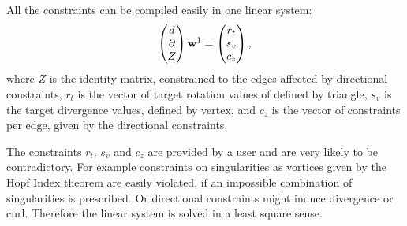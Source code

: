All the constraints can be compiled easily in one linear system:
\begin{equation}\begin{pmatrix} d \\
\partial \\
Z
\end{pmatrix} \textbf{w}^1
= \begin{pmatrix}
r_t \\
s_v \\
c_z
\end{pmatrix}, \label{eq:vfdesign1}
\end{equation}
where $Z$ is the identity matrix, constrained to the edges  affected by directional constraints, $r_t$ is the vector of target rotation values of defined by triangle, $s_v$ is the  target divergence values, defined by vertex, and $c_z$ is the vector of constraints per edge, given by the directional constraints.

The constraints $r_t$, $s_v$ and $c_z$ are provided by a user and are very likely to be contradictory. For example constraints on singularities as vortices given by the Hopf Index theorem are easily violated, if an impossible combination of singularities is prescribed. Or directional constraints might induce divergence or curl. Therefore the linear system is solved in a least square sense.

